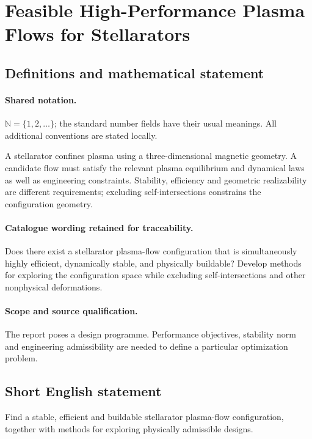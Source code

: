 \documentclass[11pt]{article}
\begin{document}
\section{Feasible High-Performance Plasma Flows for Stellarators}\label{statement}

\subsection{Definitions and mathematical statement}

\paragraph{Shared notation.}$\mathbb N=\{1,2,\ldots\}$; the standard number fields have their usual meanings. All additional conventions are stated locally.


A stellarator confines plasma using a three-dimensional magnetic geometry. A candidate flow must satisfy the relevant plasma equilibrium and dynamical laws as well as engineering constraints. Stability, efficiency and geometric realizability are different requirements; excluding self-intersections constrains the configuration geometry.

\paragraph{Catalogue wording retained for traceability.}
Does there exist a stellarator plasma-flow configuration that is simultaneously highly efficient, dynamically stable, and physically buildable? Develop methods for exploring the configuration space while excluding self-intersections and other nonphysical deformations.

\paragraph{Scope and source qualification.}The report poses a design programme. Performance objectives, stability norm and engineering admissibility are needed to define a particular optimization problem.
\subsection{Short English statement}
Find a stable, efficient and buildable stellarator plasma-flow configuration, together with methods for exploring physically admissible designs.
\end{document}
